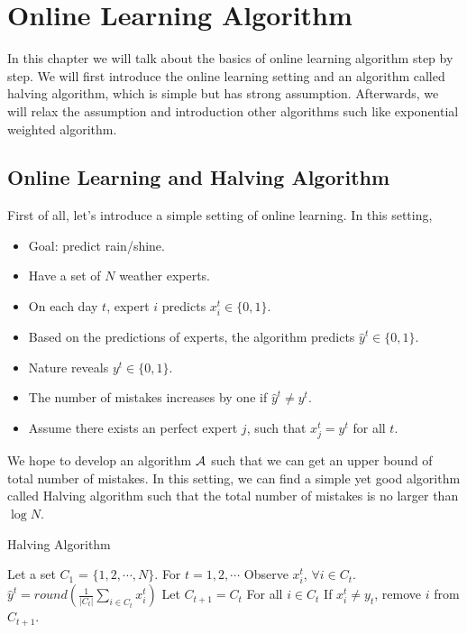 \documentclass[../main.tex]{subfiles}
\begin{document}
\chapter{Online Learning Algorithm}
In this chapter we will talk about the basics of online learning algorithm step by step. We will first introduce the online learning setting and an algorithm called halving algorithm, which is simple but has strong assumption. Afterwards, we will relax the assumption and introduction other algorithms such like exponential weighted algorithm.

\section{Online Learning and Halving Algorithm}

First of all, let's introduce a simple setting of online learning. In this setting,

\begin{itemize}
	\item Goal: predict rain/shine.
	\item Have a set of $N$ weather experts.
	\item On each day $t$, expert $i$ predicts $x^t_{i} \in \{0, 1\}$.
	\item Based on the predictions of experts, the algorithm predicts $\hat{y}^t \in \{0, 1\}$.
	\item Nature reveals $y^t \in \{0, 1\}$.
	\item The number of mistakes increases by one if $\hat{y}^t  \neq y^t$.
	\item Assume there exists an perfect expert $j$, such that $x^t_{j} = y^t$ for all $t$.
\end{itemize}

We hope to develop an algorithm $\mathcal{A}$ such that we can get an upper bound of total number of mistakes. In this setting, we can find a simple yet good algorithm called Halving algorithm such that the total number of mistakes is no larger than $\log N$.

\begin{algorithm}[H]
	\caption{Halving Algorithm}
	\begin{algorithmic}
		\STATE Let a set $C_1$ = $\{1, 2, \cdots, N\}$.
		\STATE For $t = 1, 2, \cdots$
		\bindent
		\STATE Observe $x^t_{i}$, $\forall i \in C_t$.
		\STATE $\hat{y}^t = round(\frac{1}{|C_t|} \sum\limits_{i\in C_t} x^t_{i})$
		\STATE Let $C_{t+1} = C_t$
		\STATE For all $i \in C_t$
		\bindentt
			\STATE If $x^t_{i}\neq y_{t}$, remove $i$ from $C_{t+1}$.
		\eindentt
		\eindent
	\end{algorithmic}
\end{algorithm}
\end{document}
